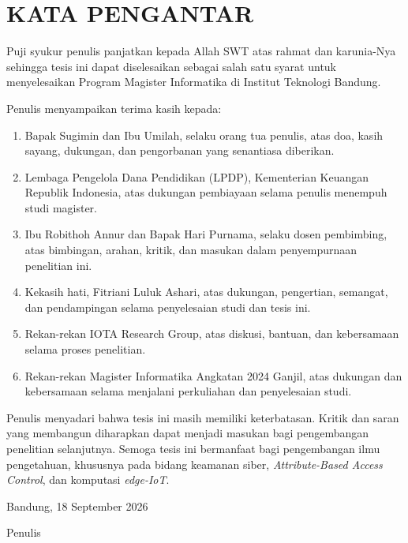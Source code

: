 
\chapter*{KATA PENGANTAR}

{}

\normalfont
\justifying

Puji syukur penulis panjatkan kepada Allah SWT atas rahmat dan karunia-Nya
sehingga tesis ini dapat diselesaikan sebagai salah satu syarat untuk
menyelesaikan Program Magister Informatika di Institut Teknologi Bandung.

Penulis menyampaikan terima kasih kepada:

\begin{enumerate}
    \item Bapak Sugimin dan Ibu Umilah, selaku orang tua penulis, atas doa, kasih sayang, dukungan, dan pengorbanan yang senantiasa diberikan.
    \item Lembaga Pengelola Dana Pendidikan (LPDP), Kementerian Keuangan Republik Indonesia, atas dukungan pembiayaan selama penulis menempuh studi magister.
    \item Ibu Robithoh Annur dan Bapak Hari Purnama, selaku dosen pembimbing, atas bimbingan, arahan, kritik, dan masukan dalam penyempurnaan penelitian ini.
    \item Kekasih hati, Fitriani Luluk Ashari, atas dukungan, pengertian, semangat, dan pendampingan selama penyelesaian studi dan tesis ini.
    \item Rekan-rekan IOTA Research Group, atas diskusi, bantuan, dan kebersamaan selama proses penelitian.
    \item Rekan-rekan Magister Informatika Angkatan 2024 Ganjil, atas dukungan dan kebersamaan selama menjalani perkuliahan dan penyelesaian studi.
\end{enumerate}

Penulis menyadari bahwa tesis ini masih memiliki keterbatasan. 
Kritik dan saran yang membangun diharapkan dapat menjadi masukan bagi pengembangan penelitian selanjutnya. 
Semoga tesis ini bermanfaat bagi pengembangan ilmu pengetahuan, khususnya pada bidang keamanan siber, \textit{Attribute-Based Access Control}, dan komputasi \textit{edge-IoT}.

\vspace{2\baselineskip}

\begin{flushright}
Bandung, 18 September 2026

\vspace{2\baselineskip}

Penulis
\end{flushright}